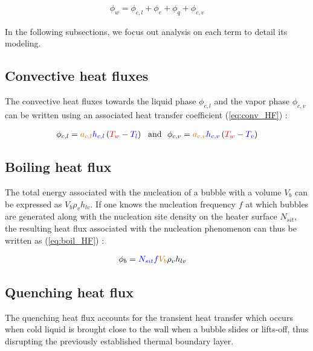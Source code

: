 \begin{align}
\label{eq:HFP}
\phi_{w}=\phi_{c,l} + \phi_{e} + \phi_{q} + \phi_{c,v}
\end{align}


In the following subsections, we focus out analysis on each term to detail its modeling.

\npar


\subsection{Convective heat fluxes}
\label{subsec:conv_HF}

The convective heat fluxes towards the liquid phase $\phi_{c,l}$ and the vapor phase $\phi_{c,v}$ can be written using an associated heat transfer coefficient (\ref{eq:conv_HF}) :

\begin{align}
\label{eq:conv_HF}
\phi_{c,l}=\orangemath{a_{c,l}} \bluemath{h_{c,l}}\parth{\redmath{T_{w}}-\bluemath{T_{l}}} ~\text{ and }~
\phi_{c,v}=\orangemath{a_{c,v}} \bluemath{ h_{c,v}}\parth{\redmath{T_{w}}-\bluemath{T_{v}}}
\end{align}



\subsection{Boiling heat flux}

The total energy associated with the nucleation of a bubble with a volume $V_{b}$ can be expressed as $V_{b}\rho_{v}h_{lv}$. If one knows the nucleation frequency $f$ at which bubbles are generated along with the nucleation site density on the heater surface $N_{sit}$, the resulting heat flux associated with the nucleation phenomenon can thus be written as (\ref{eq:boil_HF}) :

\begin{align}
\label{eq:boil_HF}
\phi_{b}&=\bluemath{N_{sit}} \bluemath{f} \orangemath{V_{b}} \rho_{v} h_{lv}
\end{align}

\subsection{Quenching heat flux}

The quenching heat flux accounts for the transient heat transfer which occurs when cold liquid is brought close to the wall when a bubble slides or lifts-off, thus disrupting the previously established thermal boundary layer.

